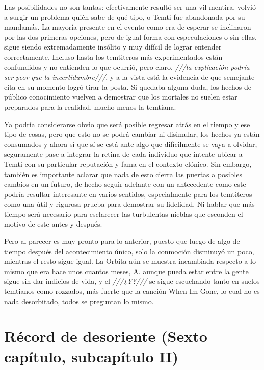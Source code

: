 \documentclass[
  spanish,
]{book}
\begin{document}
Las posibilidades no son tantas: efectivamente resultó ser una vil mentira, volvió a surgir un problema quién sabe de qué tipo, o Temti fue abandonada por su mandamás. La mayoría presente en el evento como era de esperar se inclinaron por las dos primeras opciones, pero de igual forma con especulaciones o sin ellas, sigue siendo extremadamente insólito y muy difícil de lograr entender correctamente. Incluso hasta los temtiteros más experimentados están confundidos y no entienden lo que ocurrió, pero claro, \emph{///la explicación podría ser peor que la incertidumbre///}, y a la vista está la evidencia de que semejante cita en su momento logró tirar la posta. Si quedaba alguna duda, los hechos de público conocimiento vuelven a demostrar que los mortales no suelen estar preparados para la realidad, mucho menos la temtiana.

Ya podría considerarse obvio que será posible regresar atrás en el tiempo y ese tipo de cosas, pero que esto no se podrá cambiar ni disimular, los hechos ya están consumados y ahora sí que sí se está ante algo que difícilmente se vaya a olvidar, seguramente pase a integrar la retina de cada individuo que intente ubicar a Temti con su particular reputación y fama en el contexto clónico. Sin embargo, también es importante aclarar que nada de esto cierra las puertas a posibles cambios en un futuro, de hecho seguir adelante con un antecedente como este podría resultar interesante en varios sentidos, especialmente para los temtiteros como una útil y rigurosa prueba para demostrar su fidelidad. Ni hablar que más tiempo será necesario para esclarecer las turbulentas nieblas que esconden el motivo de este antes y después.

Pero al parecer es muy pronto para lo anterior, puesto que luego de algo de tiempo después del acontecimiento único, solo la conmoción disminuyó un poco, mientras el resto sigue igual.
La Orbita aún se muestra incambiada respecto a lo mismo que era hace unos cuantos meses, A.
aunque pueda estar entre la gente sigue sin dar indicios de vida, y el \emph{///¿Y?///} se sigue escuchando tanto en suelos temtianos como rozzados, más fuerte que la canción When Im Gone, lo cual no es nada desorbitado, todos se preguntan lo mismo.

\hypertarget{ruxe9cord-de-desoriente-sexto-capuxedtulo-subcapuxedtulo-ii}{%
\section{Récord de desoriente (Sexto capítulo, subcapítulo II)}\label{ruxe9cord-de-desoriente-sexto-capuxedtulo-subcapuxedtulo-ii}}
\end{document}
